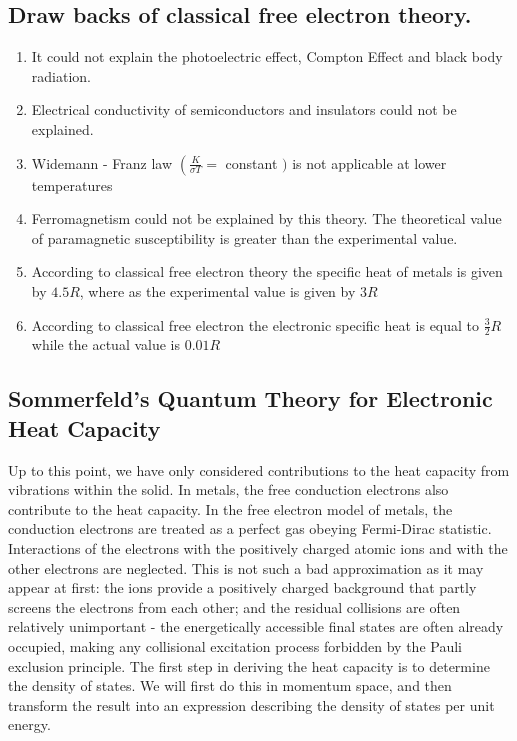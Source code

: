 \subsection{Draw backs of classical free electron theory.}
\begin{enumerate}
	\item  It could not explain the photoelectric effect, Compton Effect and black body radiation.
	\item Electrical conductivity of semiconductors and insulators could not be explained.
	\item  Widemann - Franz law $\left(\frac{K}{\sigma T}=\right.$ constant $)$ is not applicable at lower temperatures
	\item Ferromagnetism could not be explained by this theory. The theoretical value of paramagnetic susceptibility is greater than the experimental value.
	\item According to classical free electron theory the specific heat of metals is given by $4.5 R$, where as the experimental value is given by $3 R$
	\item According to classical free electron the electronic specific heat is equal to $\frac{3}{2} R$ while the actual value is $0.01 R$
\end{enumerate}
\subsection{Sommerfeld's Quantum Theory for Electronic Heat Capacity}
Up to this point, we have only considered contributions to the heat capacity from vibrations within the solid. In metals, the free conduction electrons also contribute to the heat capacity. In the free electron model of metals, the conduction electrons are treated as a perfect gas obeying Fermi-Dirac statistic. Interactions of the electrons with the positively charged atomic ions and with the other electrons are neglected. This is not such a bad approximation as it may appear at first: the ions provide a positively charged background that partly screens the electrons from each other; and the residual collisions are often relatively unimportant - the energetically accessible final states are often already occupied, making any collisional excitation process forbidden by the Pauli exclusion principle. The first step in deriving the heat capacity is to determine the density of states. We will first do this in momentum space, and then transform the result into an expression describing the density of states per unit energy.
